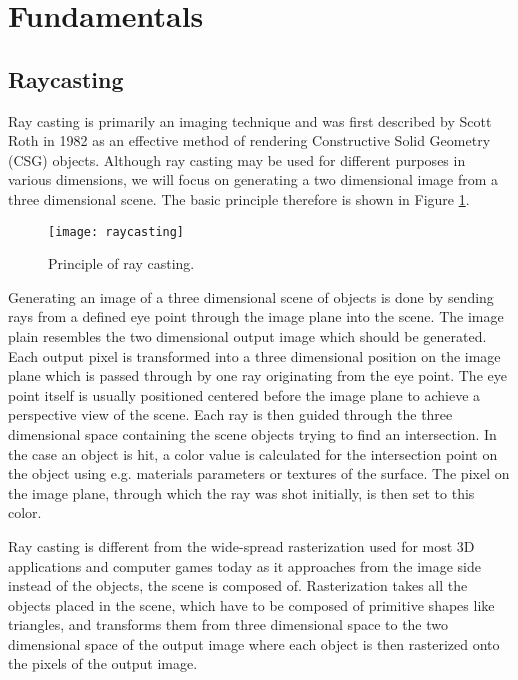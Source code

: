 \section{Fundamentals}
\label{sec:fundamentals}

\subsection{Raycasting}

Ray casting is primarily an imaging technique and was first described by Scott Roth in 1982 as an effective method of rendering Constructive Solid Geometry (CSG) objects. Although ray casting may be used for different purposes in various dimensions, we will focus on generating a two dimensional image from a three dimensional scene. The basic principle therefore is shown in Figure \ref{fig:raycasting}. 

\begin{figure}
\centering
\texttt{[image: raycasting]}
\caption{Principle of ray casting.}
\label{fig:raycasting}
\end{figure}

Generating an image of a three dimensional scene of objects is done by sending rays from a defined eye point through the image plane into the scene. The image plain resembles the two dimensional output image which should be generated. Each output pixel is transformed into a three dimensional position on the image plane which is passed through by one ray originating from the eye point. The eye point itself is usually positioned centered before the image plane to achieve a perspective view of the scene. Each ray is then guided through the three dimensional space containing the scene objects trying to find an intersection. In the case an object is hit, a color value is calculated for the intersection point on the object using e.g. materials parameters or textures of the surface. The pixel on the image plane, through which the ray was shot initially, is then set to this color.

Ray casting is different from the wide-spread rasterization used for most 3D applications and computer games today as it approaches from the image side instead of the objects, the scene is composed of. Rasterization takes all the objects placed in the scene, which have to be composed of primitive shapes like triangles, and transforms them from three dimensional space to the two dimensional space of the output image where each object is then rasterized onto the pixels of the output image.


